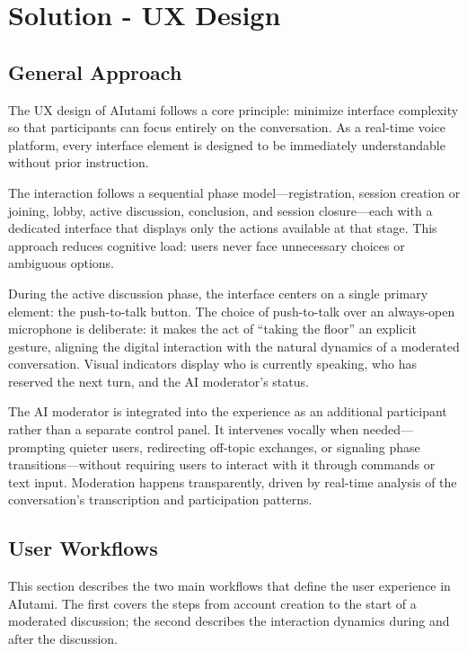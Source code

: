 \chapter{Solution - UX Design}

\section{General Approach}

The UX design of AIutami follows a core principle: minimize interface complexity so that participants can focus entirely on the conversation. As a real-time voice platform, every interface element is designed to be immediately understandable without prior instruction.

The interaction follows a sequential phase model---registration, session creation or joining, lobby, active discussion, conclusion, and session closure---each with a dedicated interface that displays only the actions available at that stage. This approach reduces cognitive load: users never face unnecessary choices or ambiguous options.

During the active discussion phase, the interface centers on a single primary element: the push-to-talk button. The choice of push-to-talk over an always-open microphone is deliberate: it makes the act of ``taking the floor'' an explicit gesture, aligning the digital interaction with the natural dynamics of a moderated conversation. Visual indicators display who is currently speaking, who has reserved the next turn, and the AI moderator's status.

The AI moderator is integrated into the experience as an additional participant rather than a separate control panel. It intervenes vocally when needed---prompting quieter users, redirecting off-topic exchanges, or signaling phase transitions---without requiring users to interact with it through commands or text input. Moderation happens transparently, driven by real-time analysis of the conversation's transcription and participation patterns.

\section{User Workflows}

This section describes the two main workflows that define the user experience in AIutami. The first covers the steps from account creation to the start of a moderated discussion; the second describes the interaction dynamics during and after the discussion.

